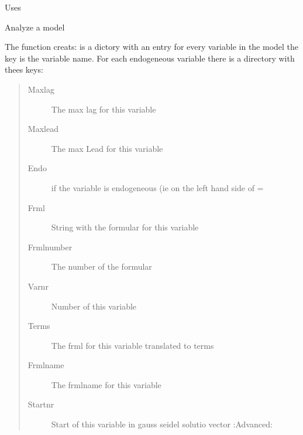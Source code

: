 \documentclass[letterpaper,10pt,english]{sphinxmanual}
\begin{document}
\begin{fulllineitems}
\begin{fulllineitems}
\sphinxAtStartPar
Uses {\hyperref[\detokenize{onboard/modelmanipulation:modelmanipulation.find_hist_model}]{}}

\end{fulllineitems}


\begin{fulllineitems}
\label{\detokenize{core/modelclass:modelclass.BaseModel.analyzemodelnew}}
\pysigstartsignatures
{}
\pysigstopsignatures
\sphinxAtStartPar
Analyze a model

\sphinxAtStartPar
The function creats: is a dictory with an entry for every variable in the model
the key is the variable name.
For each endogeneous variable there is a directory with thees keys:
\begin{quote}\begin{description}
\item[{Maxlag}] \leavevmode
\sphinxAtStartPar
The max lag for this variable

\item[{Maxlead}] \leavevmode
\sphinxAtStartPar
The max Lead for this variable

\item[{Endo}] \leavevmode
{} if the variable is endogeneous (ie on the left hand side of =

\item[{Frml}] \leavevmode
\sphinxAtStartPar
String with the formular for this variable

\item[{Frmlnumber}] \leavevmode
\sphinxAtStartPar
The number of the formular

\item[{Varnr}] \leavevmode
\sphinxAtStartPar
Number of this variable

\item[{Terms}] \leavevmode
\sphinxAtStartPar
The frml for this variable translated to terms

\item[{Frmlname}] \leavevmode
\sphinxAtStartPar
The frmlname for this variable

\item[{Startnr}] \leavevmode
\sphinxAtStartPar
Start of this variable in gauss seidel solutio vector :Advanced:


\end{description}
\end{quote}
\end{fulllineitems}
\end{fulllineitems}
\end{document}

